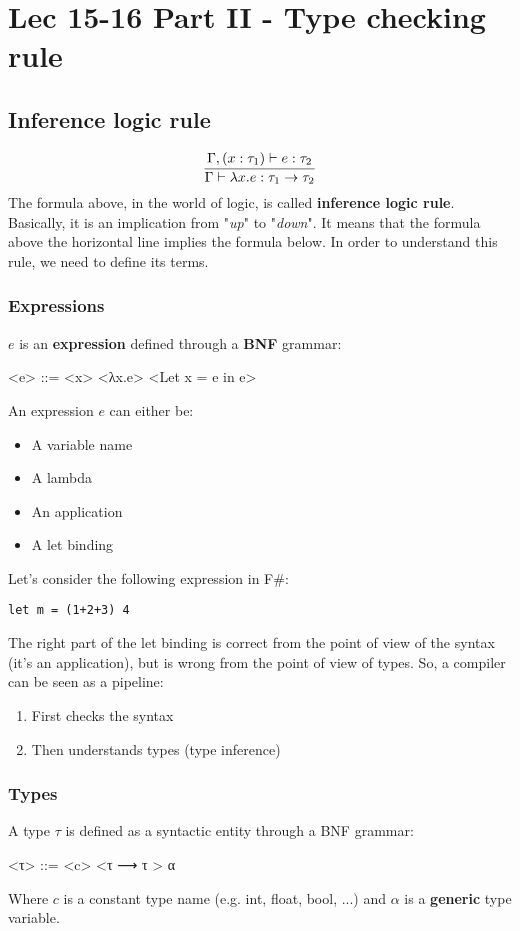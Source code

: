 \chapter{Lec 15-16 Part II - Type checking rule}

\section{Inference logic rule}
\[
    \infer{\Gamma \vdash \lambda x.e : \tau_{1} \rightarrow \tau_{2}}{\Gamma, (x:\tau_{1}) \vdash e:\tau_{2}}\]
The formula above, in the world of logic, is called \textbf{inference logic rule}. Basically, it is an implication from "\textit{up}" to "\textit{down}". It means that the formula above the horizontal line implies the formula below.\newline\newline
In order to understand this rule, we need to define its terms.
\subsection{Expressions}
\label{expr}
$e$ is an \textbf{expression} defined through a \textbf{BNF} grammar:
\begin{grammar}
    <e> ::= <x>
    \alt <λx.e> 
    \alt <Let x = e in e>
\end{grammar}
An expression $e$ can either be:
\begin{itemize}
    \item A variable name
    \item A lambda
    \item An application
    \item A let binding
\end{itemize}
Let's consider the following expression in F\#:
\begin{lstlisting}[style=FSharpStyle]
    let m = (1+2+3) 4
\end{lstlisting}
The right part of the let binding is correct from the point of view of the syntax (it's an application), but is wrong from the point of view of types. So, a compiler can be seen as a pipeline:
\begin{enumerate}
    \item First checks the syntax
    \item Then understands types (type inference)
\end{enumerate}
    
\subsection{Types}
A type $\tau$ is defined as a syntactic entity through a BNF grammar:
\begin{grammar}
    <τ> ::= <c>
    \alt <τ ⟶ τ >
    \alt α
\end{grammar}
Where $c$ is a constant type name (e.g. int, float, bool, ...) and $\alpha$ is a \textbf{generic} type variable.


